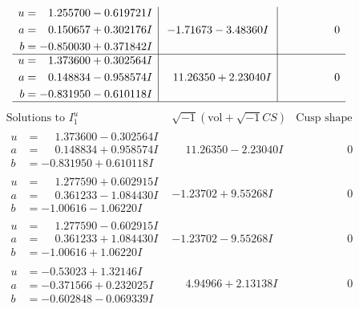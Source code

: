 \documentclass[1p]{elsarticle_modified}
\theoremstyle{definition}
\newcommand{\I}{\sqrt{-1}}
\begin{document}
$$\begin{array}{c|c|c}
\begin{aligned}
u &= \phantom{-}1.255700 - 0.619721 I \\
a &= \phantom{-}0.150657 + 0.302176 I \\
b &= -0.850030 + 0.371842 I\end{aligned}
 & -1.71673 - 3.48360 I & \phantom{-0.000000 } 0 \\ \hline\begin{aligned}
u &= \phantom{-}1.373600 + 0.302564 I \\
a &= \phantom{-}0.148834 - 0.958574 I \\
b &= -0.831950 - 0.610118 I\end{aligned}
 & \phantom{-}11.26350 + 2.23040 I & \phantom{-0.000000 } 0\\
 \hline 
 \end{array}$$\newpage$$\begin{array}{c|c|c}  
\text{Solutions to }I^u_{1}& \I (\text{vol} + \sqrt{-1}CS) & \text{Cusp shape}\\
 \hline 
\begin{aligned}
u &= \phantom{-}1.373600 - 0.302564 I \\
a &= \phantom{-}0.148834 + 0.958574 I \\
b &= -0.831950 + 0.610118 I\end{aligned}
 & \phantom{-}11.26350 - 2.23040 I & \phantom{-0.000000 } 0 \\ \hline\begin{aligned}
u &= \phantom{-}1.277590 + 0.602915 I \\
a &= \phantom{-}0.361233 - 1.084430 I \\
b &= -1.00616 - 1.06220 I\end{aligned}
 & -1.23702 + 9.55268 I & \phantom{-0.000000 } 0 \\ \hline\begin{aligned}
u &= \phantom{-}1.277590 - 0.602915 I \\
a &= \phantom{-}0.361233 + 1.084430 I \\
b &= -1.00616 + 1.06220 I\end{aligned}
 & -1.23702 - 9.55268 I & \phantom{-0.000000 } 0 \\ \hline\begin{aligned}
u &= -0.53023 + 1.32146 I \\
a &= -0.371566 + 0.232025 I \\
b &= -0.602848 - 0.069339 I\end{aligned}
 & \phantom{-}4.94966 + 2.13138 I & \phantom{-0.000000 } 0 \\ \hline\begin{aligned}

\end{aligned}
\end{array}$$
\end{document}
